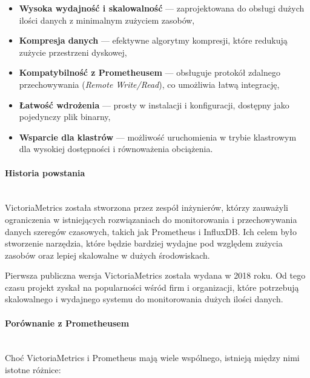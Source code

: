\documentclass{article}
\begin{document}
\begin{itemize}
    \item \textbf{Wysoka wydajność i skalowalność} — zaprojektowana do obsługi dużych ilości danych z minimalnym zużyciem zasobów,
    \item \textbf{Kompresja danych} — efektywne algorytmy kompresji, które redukują zużycie przestrzeni dyskowej,
    \item \textbf{Kompatybilność z Prometheusem} — obsługuje protokół zdalnego przechowywania (\textit{Remote Write/Read}), co umożliwia łatwą integrację,
    \item \textbf{Łatwość wdrożenia} — prosty w instalacji i konfiguracji, dostępny jako pojedynczy plik binarny,
    \item \textbf{Wsparcie dla klastrów} — możliwość uruchomienia w trybie klastrowym dla wysokiej dostępności i równoważenia obciążenia.
\end{itemize}

\paragraph{Historia powstania}\mbox{} \\

VictoriaMetrics została stworzona przez zespół inżynierów, którzy zauważyli ograniczenia w istniejących rozwiązaniach do monitorowania i przechowywania danych szeregów czasowych, takich jak Prometheus i InfluxDB. Ich celem było stworzenie narzędzia, które będzie bardziej wydajne pod względem zużycia zasobów oraz lepiej skalowalne w dużych środowiskach.

Pierwsza publiczna wersja VictoriaMetrics została wydana w 2018 roku. Od tego czasu projekt zyskał na popularności wśród firm i organizacji, które potrzebują skalowalnego i wydajnego systemu do monitorowania dużych ilości danych.

\paragraph{Porównanie z Prometheusem}\mbox{} \\


Choć VictoriaMetrics i Prometheus mają wiele wspólnego, istnieją między nimi istotne różnice:
\end{document}
